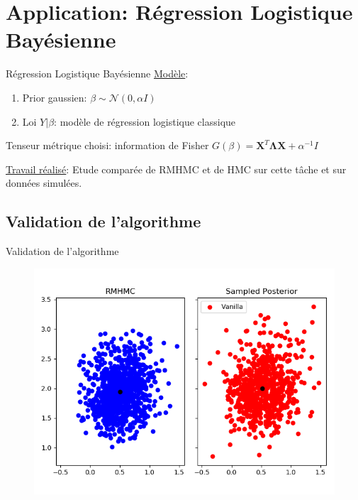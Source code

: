 \documentclass{beamer}
\begin{document}
  \section{Application: Régression Logistique Bayésienne}
  \begin{frame}{Régression Logistique Bayésienne}
	\underline{Modèle}: 
	\begin{enumerate}
	\item Prior gaussien: $ \beta \sim \mathcal{N}(0,\alpha I) $
	\item Loi $Y|\beta$: modèle de régression logistique classique
\end{enumerate}	  
  
  	Tenseur métrique choisi: information de Fisher $G(\beta)=\bm{X}^T\bm{\Lambda}\bm{X}+\alpha^{-1}I$
  	
  	\underline{Travail réalisé}: Etude comparée de RMHMC et de HMC sur cette tâche et sur données simulées.
  \end{frame}

\subsection{Validation de l'algorithme}
\begin{frame}{Validation de l'algorithme}
   \begin{figure}
   \includegraphics[scale=0.4]{figs/posterior_comparison_100_vs_100.png}
   \end{figure}
\end{frame}
\end{document}
